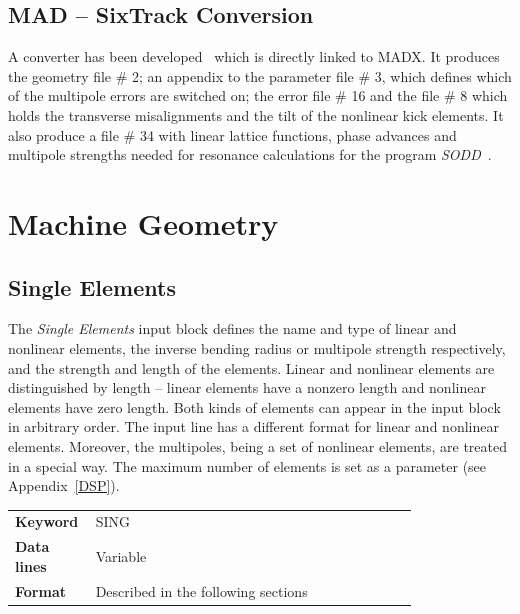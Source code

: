 \subsection{MAD -- SixTrack Conversion} \label{MADT}

A converter has been developed~\cite{CONVERTOR} which is directly linked to MADX\@.
It produces the geometry file \# 2; an appendix to the parameter file \# 3, which defines which of the multipole errors are switched on; the error file \# 16 and the file \# 8 which holds the transverse misalignments and the tilt of the nonlinear kick elements.
It also produce a file \# 34 with linear lattice functions, phase advances and multipole strengths needed for resonance calculations for the program {\it SODD}~\cite{SODD}.

\section{Machine Geometry} \label{MaGe}

\subsection{Single Elements} \label{SinEle}

The \textit{Single Elements} input block defines the name and type of linear and nonlinear elements, the inverse bending radius or multipole strength respectively, and the strength and length of the elements.
Linear and nonlinear elements are distinguished by length -- linear elements have a nonzero length and nonlinear elements have zero length.
Both kinds of elements can appear in the input block in arbitrary order.
The input line has a different format for linear and nonlinear elements.
Moreover, the multipoles, being a set of nonlinear elements, are treated in a special way.
The maximum number of elements is set as a parameter (see Appendix~\ref{DSP}).

\bigskip
\begin{tabular}{@{}lp{0.8\linewidth}}
    \textbf{Keyword}    & SING \\
    \textbf{Data lines} & Variable \\
    \textbf{Format}     & Described in the following sections
\end{tabular}

